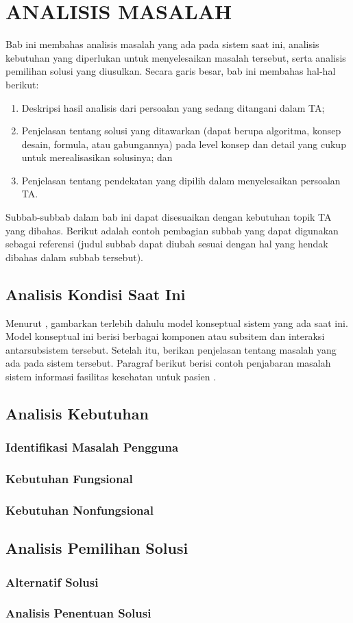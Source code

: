 
\cleardoublepage
\chapter{ANALISIS MASALAH}
\label{chap:analisis-masalah}
Bab ini membahas analisis masalah yang ada pada sistem saat ini, analisis kebutuhan yang diperlukan
untuk menyelesaikan masalah tersebut, serta analisis pemilihan solusi yang diusulkan. Secara garis besar,
bab ini membahas hal-hal berikut:
\begin{enumerate}[1.]
    \item Deskripsi hasil analisis dari persoalan yang sedang ditangani dalam TA;
    \item Penjelasan tentang solusi yang ditawarkan (dapat berupa algoritma, konsep desain, formula, atau gabungannya) 
    pada level konsep dan detail yang cukup untuk merealisasikan solusinya; dan
    \item Penjelasan tentang pendekatan yang dipilih dalam menyelesaikan persoalan TA.
\end{enumerate}
Subbab-subbab dalam bab ini dapat disesuaikan dengan kebutuhan topik TA yang dibahas. Berikut adalah contoh pembagian subbab
yang dapat digunakan sebagai referensi (judul subbab dapat diubah sesuai dengan hal yang hendak dibahas dalam subbab tersebut).

\section{Analisis Kondisi Saat Ini}
Menurut \textcite{laudon2020}, gambarkan terlebih dahulu model konseptual sistem yang ada saat ini. Model konseptual ini berisi berbagai komponen atau subsitem dan interaksi antarsubsistem tersebut. Setelah itu, berikan penjelasan tentang masalah yang ada pada sistem tersebut. Paragraf berikut berisi contoh penjabaran masalah sistem informasi fasilitas kesehatan untuk pasien \autocite{pressman2019}. 
\section{Analisis Kebutuhan}
\lipsum[4]
\subsection{Identifikasi Masalah Pengguna}
\lipsum[5]
\subsection{Kebutuhan Fungsional}
\lipsum[6]
\subsection{Kebutuhan Nonfungsional}
\lipsum[7]

\section{Analisis Pemilihan Solusi}
\subsection{Alternatif Solusi}
\lipsum[8]
\subsection{Analisis Penentuan Solusi}
\lipsum[9]